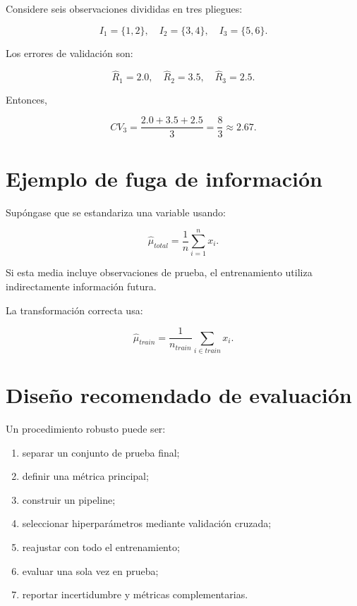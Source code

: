 \documentclass[
  spanish,
  10.5pt,
  letterpaper,
  DIV=11,
  numbers=noendperiod,
  oneside,
  open=any]{scrreprt}
\providecommand{\tightlist}{%
  \setlength{\itemsep}{0pt}\setlength{\parskip}{0pt}}
\theoremstyle{definition}
\theoremstyle{definition}
\theoremstyle{plain}
\theoremstyle{remark}
\begin{document}

Considere seis observaciones divididas en tres pliegues:

\[
I_1=\{1,2\},
\quad
I_2=\{3,4\},
\quad
I_3=\{5,6\}.
\]

Los errores de validación son:

\[
\widehat{R}_1=2.0,
\quad
\widehat{R}_2=3.5,
\quad
\widehat{R}_3=2.5.
\]

Entonces,

\[
CV_3
=
\frac{2.0+3.5+2.5}{3}
=
\frac{8}{3}
\approx
2.67.
\]

\section*{Ejemplo de fuga de
información}\label{ejemplo-de-fuga-de-informaciuxf3n}


Supóngase que se estandariza una variable usando:

\[
\widehat{\mu}_{total}
=
\frac{1}{n}
\sum_{i=1}^{n}x_i.
\]

Si esta media incluye observaciones de prueba, el entrenamiento utiliza
indirectamente información futura.

La transformación correcta usa:

\[
\widehat{\mu}_{train}
=
\frac{1}{n_{train}}
\sum_{i\in train}x_i.
\]

\section*{Diseño recomendado de
evaluación}\label{diseuxf1o-recomendado-de-evaluaciuxf3n}


Un procedimiento robusto puede ser:

\begin{enumerate}
\def\labelenumi{\arabic{enumi}.}
\tightlist
\item
  separar un conjunto de prueba final;
\item
  definir una métrica principal;
\item
  construir un pipeline;
\item
  seleccionar hiperparámetros mediante validación cruzada;
\item
  reajustar con todo el entrenamiento;
\item
  evaluar una sola vez en prueba;
\item
  reportar incertidumbre y métricas complementarias.
\end{enumerate}
\end{document}
